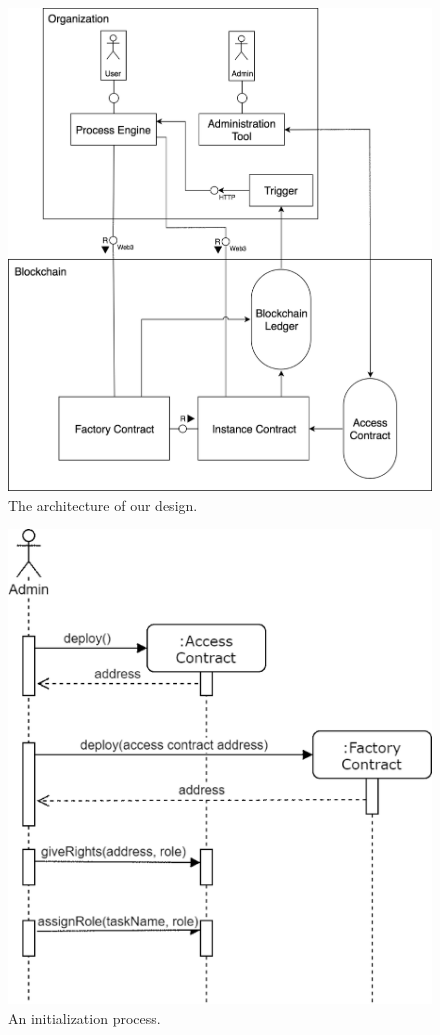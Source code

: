 \documentclass[runningheads]{llncs}
\begin{document}
\begin{figure}
\includegraphics[width=\textwidth]{fig/system_diagram.eps}
\caption{The architecture of our design.} \label{fig1}
\end{figure}

\begin{figure}
\includegraphics[width=\textwidth]{fig/initialization.eps}
\caption{An initialization process.} \label{fig2}
\end{figure}
\end{document}
